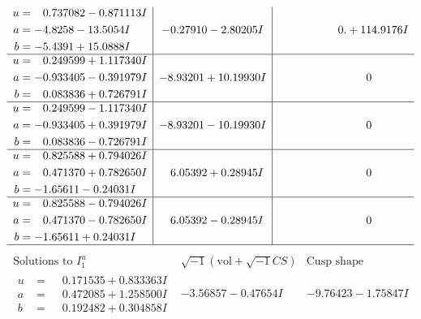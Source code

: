 \documentclass[1p]{elsarticle_modified}
\theoremstyle{definition}
\newcommand{\I}{\sqrt{-1}}
\begin{document}
$$\begin{array}{c|c|c}
\begin{aligned}
u &= \phantom{-}0.737082 - 0.871113 I \\
a &= -4.8258 - 13.5054 I \\
b &= -5.4391 + 15.0888 I\end{aligned}
 & -0.27910 - 2.80205 I & \phantom{-0.000000 -}0. + 114.9176 I \\ \hline\begin{aligned}
u &= \phantom{-}0.249599 + 1.117340 I \\
a &= -0.933405 - 0.391979 I \\
b &= \phantom{-}0.083836 + 0.726791 I\end{aligned}
 & -8.93201 + 10.19930 I & \phantom{-0.000000 } 0 \\ \hline\begin{aligned}
u &= \phantom{-}0.249599 - 1.117340 I \\
a &= -0.933405 + 0.391979 I \\
b &= \phantom{-}0.083836 - 0.726791 I\end{aligned}
 & -8.93201 - 10.19930 I & \phantom{-0.000000 } 0 \\ \hline\begin{aligned}
u &= \phantom{-}0.825588 + 0.794026 I \\
a &= \phantom{-}0.471370 + 0.782650 I \\
b &= -1.65611 - 0.24031 I\end{aligned}
 & \phantom{-}6.05392 + 0.28945 I & \phantom{-0.000000 } 0 \\ \hline\begin{aligned}
u &= \phantom{-}0.825588 - 0.794026 I \\
a &= \phantom{-}0.471370 - 0.782650 I \\
b &= -1.65611 + 0.24031 I\end{aligned}
 & \phantom{-}6.05392 - 0.28945 I & \phantom{-0.000000 } 0\\
 \hline 
 \end{array}$$\newpage$$\begin{array}{c|c|c}  
\text{Solutions to }I^u_{1}& \I (\text{vol} + \sqrt{-1}CS) & \text{Cusp shape}\\
 \hline 
\begin{aligned}
u &= \phantom{-}0.171535 + 0.833363 I \\
a &= \phantom{-}0.472085 + 1.258500 I \\
b &= \phantom{-}0.192482 + 0.304858 I\end{aligned}
 & -3.56857 - 0.47654 I & -9.76423 - 1.75847 I \\ \hline\begin{aligned}

\end{aligned}
\end{array}$$
\end{document}
